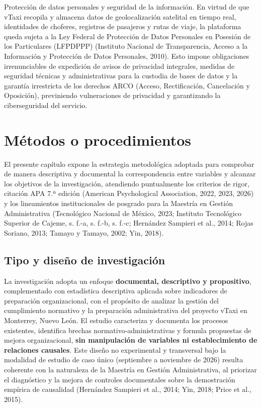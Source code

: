 {Protección de datos personales y seguridad de la información. En virtud de que vTaxi recopila y almacena datos de geolocalización satelital en tiempo real, identidades de choferes, registros de pasajeros y rutas de viaje, la plataforma queda sujeta a la Ley Federal de Protección de Datos Personales en Posesión de los Particulares (LFPDPPP) (Instituto Nacional de Transparencia, Acceso a la Información y Protección de Datos Personales, 2010). Esto impone obligaciones irrenunciables de expedición de avisos de privacidad integrales, medidas de seguridad técnicas y administrativas para la custodia de bases de datos y la garantía irrestricta de los derechos ARCO (Acceso, Rectificación, Cancelación y Oposición), previniendo vulneraciones de privacidad y garantizando la ciberseguridad del servicio.

\section{Métodos o procedimientos}
El presente capítulo expone la estrategia metodológica adoptada para comprobar de manera descriptiva y documental la correspondencia entre variables y alcanzar los objetivos de la investigación, atendiendo puntualmente los criterios de rigor, citación APA 7.ª edición (American Psychological Association, 2022, 2023, 2026) y los lineamientos institucionales de posgrado para la Maestría en Gestión Administrativa (Tecnológico Nacional de México, 2023; Instituto Tecnológico Superior de Cajeme, s. f.-a, s. f.-b, s. f.-c; Hernández Sampieri et al., 2014; Rojas Soriano, 2013; Tamayo y Tamayo, 2002; Yin, 2018).

\subsection{Tipo y diseño de investigación}
La investigación adopta un enfoque \textbf{documental, descriptivo y propositivo}, complementado con estadística descriptiva aplicada sobre indicadores de preparación organizacional, con el propósito de analizar la gestión del cumplimiento normativo y la preparación administrativa del proyecto vTaxi en Monterrey, Nuevo León. El estudio caracteriza y documenta los procesos existentes, identifica brechas normativo-administrativas y formula propuestas de mejora organizacional, \textbf{sin manipulación de variables ni establecimiento de relaciones causales}. Este diseño no experimental y transversal bajo la modalidad de estudio de caso único (septiembre a noviembre de 2026) resulta coherente con la naturaleza de la Maestría en Gestión Administrativa, al priorizar el diagnóstico y la mejora de controles documentales sobre la demostración empírica de causalidad (Hernández Sampieri et al., 2014; Yin, 2018; Price et al., 2015).

}
